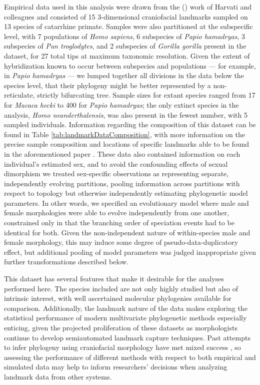 Empirical data used in this analysis were drawn from the (\citeyear{harvatiNeanderthalTaxonomyReconsidered2004}) work of Harvati and colleagues and consisted of 15 3-dimensional craniofacial landmarks sampled on 13 species of catarrhine primate. Samples were also partitioned at the subspecific level, with 7 populations of \textit{Homo sapiens}, 6 subspecies of \textit{Papio hamadryas}, 3 subspecies of \textit{Pan troglodytes}, and 2 subspecies of \textit{Gorilla gorilla} present in the dataset, for 27 total tips at maximum taxonomic resolution. Given the extent of hybridization known to occur between subspecies and populations --- for example, in \textit{Papio hamadryas} \citep{rogersComparativeGenomicsComplex2019} --- we lumped together all divisions in the data below the species level, that their phylogeny might be better represented by a non-reticulate, strictly bifurcating tree. Sample sizes for extant species ranged from 17 for \textit{Macaca hecki} to 400 for \textit{Papio hamadryas}; the only extinct species in the analysis, \textit{Homo neanderthalensis}, was also present in the fewest number, with 5 sampled individuals. Information regarding the composition of this dataset can be found in Table \ref{tab:landmarkDataComposition}, with more information on the precise sample composition and locations of specific landmarks able to be found in the aforementioned paper \citep{harvatiNeanderthalTaxonomyReconsidered2004}. These data also contained information on each individual's estimated sex, and to avoid the confounding effects of sexual dimorphism we treated sex-specific observations as representing separate, independently evolving partitions, pooling information across partitions with respect to topology but otherwise independently estimating phylogenetic model parameters. In other words, we specified an evolutionary model where male and female morphologies were able to evolve independently from one another, constrained only in that the branching order of speciation events had to be identical for both. Given the non-independent nature of within-species male and female morphology, this may induce some degree of pseudo-data-duplicatory effect, but additional pooling of model parameters was judged inappropriate given further transformations described below.

This dataset has several features that make it desirable for the analyses performed here. The species included are not only highly studied but also of intrinsic interest, with well ascertained molecular phylogenies available for comparison. Additionally, the landmark nature of the data makes exploring the statistical performance of modern multivariate phylogenetic methods especially enticing, given the projected proliferation of these datasets as morphologists continue to develop semiautomated landmark capture techniques. Past attempts to infer phylogeny using craniofacial morphology have met mixed success \citep[e.g.][]{collardHowReliableAre2000}, so assessing the performance of different methods with respect to both empirical and simulated data may help to inform researchers' decisions when analyzing landmark data from other systems. 

